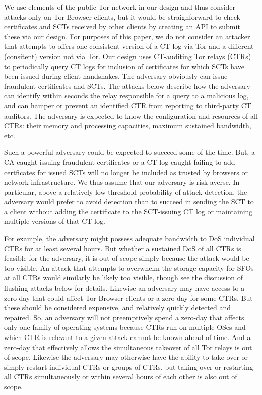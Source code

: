 We use elements of the public Tor network in our design and thus
consider attacks only on Tor Browser clients, but it would be
straighforward to check certificates and SCTs received by other
clients by creating an API to submit these via our design. For
purposes of this paper, we do not consider an attacker that attempts
to offers one consistent version of a CT log via Tor and a different
(consitent) version not via Tor.  Our design uses CT-auditing Tor
relays (CTRs) to periodically query CT logs for inclusion of
certificates for which SCTs have been issued during client
handshakes. The adversary obviously can issue fraudulent certificates
and SCTs. The attacks below describe how the adversary can identify
within seconds the relay responsible for a query to a malicious log,
and can hamper or prevent an identified CTR from reporting to
third-party CT auditors.
The adversary is expected to know the configuration and resources of
all CTRs: their memory and processing capacities, maximum sustained
bandwidth, etc. 

Such a powerful adversary could be expected to succeed some of the
time.  But, a CA caught issuing fraudulent certificates or a CT log
caught failing to add certficates for issued SCTs will no longer be
included as trusted by browsers or network infrastructure. We thus
assume that our adversary is risk-averse.  In particular, above a
relatively low threshold probability of attack detection, the
adversary would prefer to avoid detection than to succeed in sending
the SCT to a client without adding the certificate to the SCT-issuing
CT log or maintaining multiple versions of that CT log. 

For example, the adversary might possess adequate bandwidth to DoS
individual CTRs for at least several hours. But whether a sustained
DoS of all CTRs is feasible for the adversary, it is out of scope
simply because the attack would be too visible. An attack that
attempts to overwhelm the storage capacity for SFOs at all CTRs would
similarly be likely too visible, though see the discussion of flushing
attacks below for details. Likewise an adversary may have access to a
zero-day that could affect Tor Browser clients or a zero-day for some
CTRs. But these should be considered expensive, and relatively quickly
detected and repaired.  So, an adversary will not preemptively spend a
zero-day that affects only one family of operating systems because
CTRs run on multiple OSes and which CTR is relevant to a given attack
cannot be known ahead of time. And a zero-day that effectively allows
the simultaneous takeover of all Tor relays is out of scope. Likewise
the adversary may otherwise have the ability to take over or simply
restart individual CTRs or groups of CTRs, but taking over or
restarting all CTRs simultaneously or within several hours of each
other is also out of scope.


